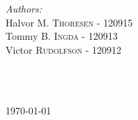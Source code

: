 \begin{titlepage}

\begin{minipage}{0.55\textwidth}
\begin{flushleft} \large
\emph{Authors:}\\
Halvor M. \textsc{Thoresen - 120915} %
\\
Tommy B. \textsc{Ingda - 120913} %
\\
Victor \textsc{Rudolfson - 120912} %
\end{flushleft}
\end{minipage}
~
\begin{minipage}{0.4\textwidth}
\begin{flushright}%
\end{flushright}
\end{minipage}\\[4cm]


{\large \today}\\[3cm] %

\vfill %

\end{titlepage}